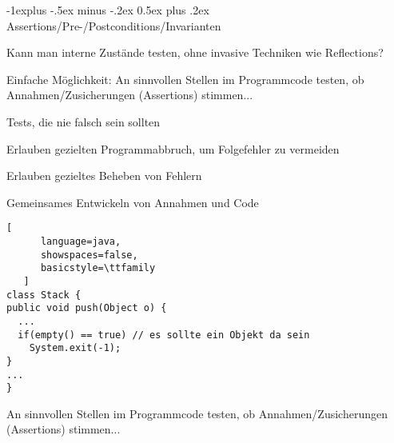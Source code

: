 \documentclass[10pt]{article}
\makeatletter
\renewcommand{\subsection}{\@startsection{subsection}{2}{0mm}%
                                {-1explus -.5ex minus -.2ex}%
                                {0.5ex plus .2ex}%
                                {\normalfont\normalsize\bfseries}}
\makeatother
\begin{document}
\subsection{Assertions/Pre-/Postconditions/Invarianten}
\begin{itemize*}
  \item Kann man interne Zustände testen, ohne invasive Techniken wie Reflections?
  \item Einfache Möglichkeit: An sinnvollen Stellen im Programmcode testen, ob Annahmen/Zusicherungen (Assertions) stimmen...
  \item Tests, die nie falsch sein sollten
  \begin{itemize*}
    \item Erlauben gezielten Programmabbruch, um Folgefehler zu vermeiden
    \item Erlauben gezieltes Beheben von Fehlern
    \item Gemeinsames Entwickeln von Annahmen und Code
  \end{itemize*}
\end{itemize*}

\begin{lstlisting}[
      language=java,
      showspaces=false,
      basicstyle=\ttfamily
   ]
class Stack {
public void push(Object o) {
  ...
  if(empty() == true) // es sollte ein Objekt da sein
    System.exit(-1);
}
...
}
\end{lstlisting}



An sinnvollen Stellen im Programmcode testen, ob Annahmen/Zusicherungen (Assertions) stimmen...
\end{document}
